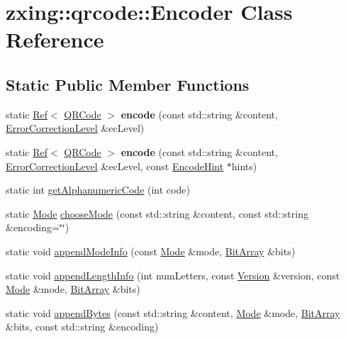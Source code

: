 \hypertarget{classzxing_1_1qrcode_1_1_encoder}{}\section{zxing\+:\+:qrcode\+:\+:Encoder Class Reference}
\label{classzxing_1_1qrcode_1_1_encoder}
\subsection*{Static Public Member Functions}
\begin{DoxyCompactItemize}
\item 
\mbox{\label{classzxing_1_1qrcode_1_1_encoder_a3de62451ddee1a743cd6a501b6c006b5}} 
static \mbox{\hyperlink{classzxing_1_1_ref}{Ref}}$<$ \mbox{\hyperlink{classzxing_1_1qrcode_1_1_q_r_code}{Q\+R\+Code}} $>$ {\bfseries encode} (const std\+::string \&content, \mbox{\hyperlink{classzxing_1_1qrcode_1_1_error_correction_level}{Error\+Correction\+Level}} \&ec\+Level)
\item 
\mbox{\label{classzxing_1_1qrcode_1_1_encoder_ab5902d25fe27d24f130bdf4306383792}} 
static \mbox{\hyperlink{classzxing_1_1_ref}{Ref}}$<$ \mbox{\hyperlink{classzxing_1_1qrcode_1_1_q_r_code}{Q\+R\+Code}} $>$ {\bfseries encode} (const std\+::string \&content, \mbox{\hyperlink{classzxing_1_1qrcode_1_1_error_correction_level}{Error\+Correction\+Level}} \&ec\+Level, const \mbox{\hyperlink{classzxing_1_1_encode_hint}{Encode\+Hint}} $\ast$hints)
\item 
static int \mbox{\hyperlink{classzxing_1_1qrcode_1_1_encoder_aba2add9a12cbce53e88816bdfc278e3b}{get\+Alphanumeric\+Code}} (int code)
\item 
static \mbox{\hyperlink{classzxing_1_1qrcode_1_1_mode}{Mode}} \mbox{\hyperlink{classzxing_1_1qrcode_1_1_encoder_a48dcb9566662fce557554140f7bc4018}{choose\+Mode}} (const std\+::string \&content, const std\+::string \&encoding=\char`\"{}\char`\"{})
\item 
static void \mbox{\hyperlink{classzxing_1_1qrcode_1_1_encoder_acad10e61c5d9a60c2b4b990d7e1c5f4d}{append\+Mode\+Info}} (const \mbox{\hyperlink{classzxing_1_1qrcode_1_1_mode}{Mode}} \&mode, \mbox{\hyperlink{classzxing_1_1_bit_array}{Bit\+Array}} \&bits)
\item 
static void \mbox{\hyperlink{classzxing_1_1qrcode_1_1_encoder_a49f0483c907f31535e9e55737b52305f}{append\+Length\+Info}} (int num\+Letters, const \mbox{\hyperlink{classzxing_1_1qrcode_1_1_version}{Version}} \&version, const \mbox{\hyperlink{classzxing_1_1qrcode_1_1_mode}{Mode}} \&mode, \mbox{\hyperlink{classzxing_1_1_bit_array}{Bit\+Array}} \&bits)
\item 
static void \mbox{\hyperlink{classzxing_1_1qrcode_1_1_encoder_a433ec7881304bbc5e64ab52417f04ad8}{append\+Bytes}} (const std\+::string \&content, \mbox{\hyperlink{classzxing_1_1qrcode_1_1_mode}{Mode}} \&mode, \mbox{\hyperlink{classzxing_1_1_bit_array}{Bit\+Array}} \&bits, const std\+::string \&encoding)
\end{DoxyCompactItemize}
